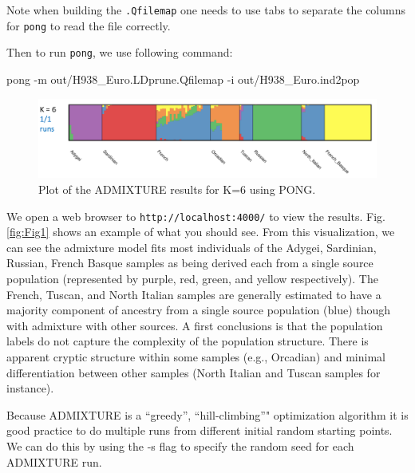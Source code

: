 \documentclass{svmult}       %
\newenvironment{Shaded}{\begin{snugshade}}{\end{snugshade}}
\newcommand{\KeywordTok}[1]{\textcolor[rgb]{0.13,0.29,0.53}{\textbf{#1}}}
\newcommand{\DataTypeTok}[1]{\textcolor[rgb]{0.13,0.29,0.53}{#1}}
\newcommand{\CommentTok}[1]{\textcolor[rgb]{0.56,0.35,0.01}{\textit{#1}}}
\newcommand{\FunctionTok}[1]{\textcolor[rgb]{0.00,0.00,0.00}{#1}}
\newcommand{\VariableTok}[1]{\textcolor[rgb]{0.00,0.00,0.00}{#1}}
\newcommand{\ExtensionTok}[1]{#1}
\newcommand{\NormalTok}[1]{#1}
\begin{document}
Note when building the \texttt{.Qfilemap} one needs to use tabs to
separate the columns for \texttt{pong} to read the file correctly.

Then to run \texttt{pong}, we use following command:

\begin{Shaded}
\begin{Highlighting}[]
\ExtensionTok{pong}\NormalTok{ -m out/H938_Euro.LDprune.Qfilemap -i out/H938_Euro.ind2pop}
\end{Highlighting}
\end{Shaded}


\begin{figure}
    \includegraphics[width=1\linewidth]{Figures/Figure2} \caption{Plot of the ADMIXTURE results for K=6 using PONG.}\label{fig:Fig2}
\end{figure}

We open a web browser to \texttt{http://localhost:4000/} to view the
results. Fig. \ref{fig:Fig1} shows an example of what you should see.
From this visualization, we can see the admixture model fits most
individuals of the Adygei, Sardinian, Russian, French Basque samples as
being derived each from a single source population (represented by
purple, red, green, and yellow respectively). The French, Tuscan, and
North Italian samples are generally estimated to have a majority
component of ancestry from a single source population (blue) though with
admixture with other sources. A first conclusions is that the population
labels do not capture the complexity of the population structure. There
is apparent cryptic structure within some samples (e.g., Orcadian) and
minimal differentiation between other samples (North Italian and Tuscan
samples for instance).

Because ADMIXTURE is a ``greedy'', ``hill-climbing''" optimization
algorithm it is good practice to do multiple runs from different initial
random starting points. We can do this by using the -s flag to specify
the random seed for each ADMIXTURE run.

\begin{Shaded}
\end{Shaded}
\end{document}
